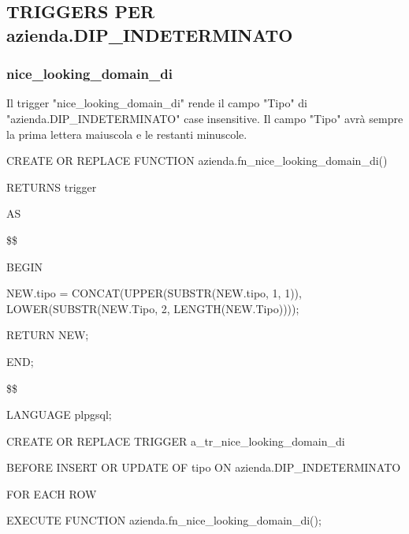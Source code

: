         \subsection{TRIGGERS PER azienda.DIP\_INDETERMINATO}

        \subsubsection{nice\_looking\_domain\_di}
        Il trigger "nice\_looking\_domain\_di" rende il campo "Tipo" di "azienda.DIP\_INDETERMINATO" case insensitive. Il campo "Tipo" avrà sempre la prima lettera maiuscola e le restanti minuscole.
        \ttfamily
            \begin{flushleft}
                \begin{description}
                    \item CREATE OR REPLACE FUNCTION azienda.fn\_nice\_looking\_domain\_di()  
                    \item RETURNS trigger
                    \item AS
                    \item \$\$
                    \item BEGIN 
                    \begin{description}
                        \item NEW.tipo = CONCAT(UPPER(SUBSTR(NEW.tipo, 1, 1)), LOWER(SUBSTR(NEW.Tipo, 2, LENGTH(NEW.Tipo))));
	                    \item RETURN NEW;
                    \end{description}
                    \item END;
                    \item \$\$
                    \item LANGUAGE plpgsql;
                \end{description}
            \end{flushleft}
        \normalfont

        \ttfamily
            \begin{flushleft}
                \begin{description}
                    \item CREATE OR REPLACE TRIGGER a\_tr\_nice\_looking\_domain\_di
                    \item BEFORE INSERT OR UPDATE OF tipo ON azienda.DIP\_INDETERMINATO
                    \item FOR EACH ROW
                    \item EXECUTE FUNCTION azienda.fn\_nice\_looking\_domain\_di();
                \end{description}
            \end{flushleft}
        \normalfont

